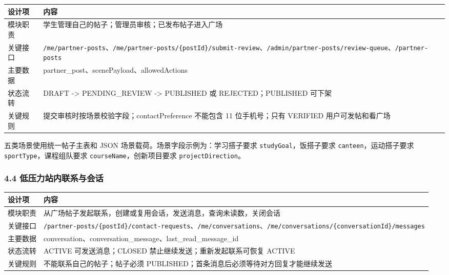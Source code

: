 \documentclass[
]{ctexart}
\begin{document}
\begin{longtable}[]{@{}
  >{\raggedright\arraybackslash}p{}
  >{\raggedright\arraybackslash}p{}@{}}
\toprule
设计项 & 内容 \\
\midrule
\endhead
模块职责 & 学生管理自己的帖子；管理员审核；已发布帖子进入广场 \\
关键接口 &
\texttt{/me/partner-posts}、\texttt{/me/partner-posts/\{postId\}/submit-review}、\texttt{/admin/partner-posts/review-queue}、\texttt{/partner-posts} \\
主要数据 & partner\_post、scenePayload、allowedActions \\
状态流转 & DRAFT -\textgreater{} PENDING\_REVIEW -\textgreater{}
PUBLISHED 或 REJECTED；PUBLISHED 可下架 \\
关键规则 & 提交审核时按场景校验字段；contactPreference 不能包含 11
位手机号；只有 VERIFIED 用户可发帖和看广场 \\
\bottomrule
\end{longtable}

五类场景使用统一帖子主表和 JSON 场景载荷。场景字段示例为：学习搭子要求
\texttt{studyGoal}，饭搭子要求 \texttt{canteen}，运动搭子要求
\texttt{sportType}，课程组队要求 \texttt{courseName}，创新项目要求
\texttt{projectDirection}。

\hypertarget{ux4f4eux538bux529bux7ad9ux5185ux8054ux7cfbux4e0eux4f1aux8bdd}{%
\subsubsection{4.4
低压力站内联系与会话}\label{ux4f4eux538bux529bux7ad9ux5185ux8054ux7cfbux4e0eux4f1aux8bdd}}

\begin{longtable}[]{@{}
  >{\raggedright\arraybackslash}p{}
  >{\raggedright\arraybackslash}p{}@{}}
\toprule
设计项 & 内容 \\
\midrule
\endhead
模块职责 &
从广场帖子发起联系，创建或复用会话，发送消息，查询未读数，关闭会话 \\
关键接口 &
\texttt{/partner-posts/\{postId\}/contact-requests}、\texttt{/me/conversations}、\texttt{/me/conversations/\{conversationId\}/messages} \\
主要数据 &
conversation、conversation\_message、last\_read\_message\_id \\
状态流转 & ACTIVE 可发送消息；CLOSED 禁止继续发送；重新发起联系可恢复
ACTIVE \\
关键规则 & 不能联系自己的帖子；帖子必须
PUBLISHED；首条消息后必须等待对方回复才能继续发送 \\
\bottomrule
\end{longtable}
\end{document}
